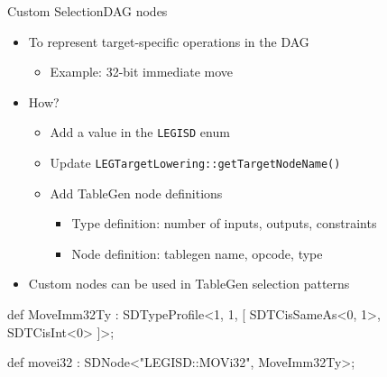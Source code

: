 \begin{frame}[fragile]{Custom SelectionDAG nodes}

\begin{itemize}
    \item To represent target-specific operations in the DAG
    \begin{itemize}
        \item Example: 32-bit immediate move
    \end{itemize}
    \item How?
    \begin{itemize}
        \item Add a value in the \texttt{LEGISD} enum
        \item Update \texttt{LEGTargetLowering::getTargetNodeName()}
        \item Add TableGen node definitions
        \begin{itemize}
            \item Type definition: number of inputs, outputs, constraints
            \item Node definition: tablegen name, opcode, type
        \end{itemize}
    \end{itemize}
    \item Custom nodes can be used in TableGen selection patterns
\end{itemize}

\begin{codebox}
def MoveImm32Ty : SDTypeProfile<1, 1, [
  SDTCisSameAs<0, 1>, SDTCisInt<0>
]>;

def movei32 : SDNode<"LEGISD::MOVi32", MoveImm32Ty>;
\end{codebox}

\end{frame}



